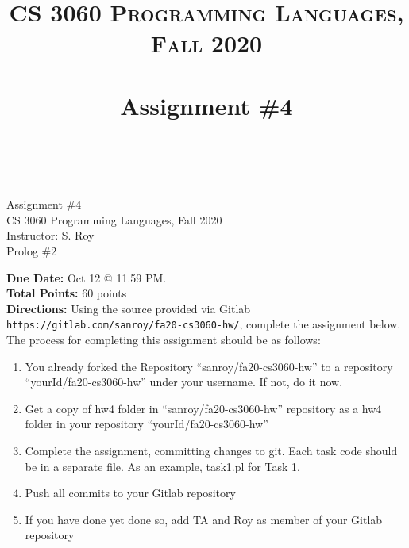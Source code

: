 \documentclass[paper=letter, fontsize=11pt]{scrartcl} %
\title{ 
    \normalfont \normalsize 
    \textsc{CS 3060 Programming Languages, Fall 2020} \\ [25pt] %
    \horrule{0.5pt} \\[0.4cm] %
    \huge Assignment \#4  \\ %
    \horrule{2pt} \\[0.5cm] %
}
\begin{document}
    \begin{center}
         Assignment \#4\\
        \small CS 3060 Programming Languages, Fall 2020 \\
        \small Instructor: S. Roy \\
        \huge Prolog \#2
    \end{center}
    
    \textbf{Due Date:} Oct 12 @ 11.59 PM. \\
    \textbf{Total Points:} 60 points \\


    \textbf{Directions:} Using the source provided via Gitlab \@ \texttt{https://gitlab.com/sanroy/fa20-cs3060-hw/},
complete the assignment below. The process for completing this assignment should be as follows:

    \begin{enumerate}[noitemsep]
        \item You already forked the Repository ``sanroy/fa20-cs3060-hw'' to a repository ``yourId/fa20-cs3060-hw'' under your username. If not, do it now.
        \item Get a copy of hw4 folder in ``sanroy/fa20-cs3060-hw'' repository as a hw4 folder in your repository ``yourId/fa20-cs3060-hw''
        \item Complete the assignment, committing changes to git. Each task code should be in a separate file. As an example, task1.pl for Task 1.
        \item Push all commits to your Gitlab repository
        \item If you have done yet done so, add TA and Roy as member of your Gitlab repository
    \end{enumerate}
\end{document}
